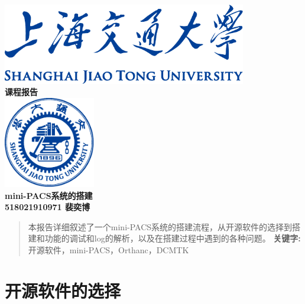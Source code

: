 \documentclass[UTF8]{ctexart}
\begin{document}

\begin{titlepage}
    \begin{center}
        \includegraphics[width=0.8\textwidth]{sjtu-name-blue.pdf}\\[1cm]
        \textsc{\Huge \bfseries 课程报告}\\[1.5cm]
        \includegraphics[width=0.3\textwidth]{sjtu-badge-blue.pdf}\\[0.5cm]

        \Huge \bfseries{mini-PACS系统的搭建}\\[1cm]
        \Large \bfseries{518021910971 裴奕博}
    \end{center}
\end{titlepage}
\tableofcontents
\newpage

\begin{abstract}
    本报告详细叙述了一个mini-PACS系统的搭建流程，从开源软件的选择到搭建和功能的调试和log的解析，以及在搭建过程中遇到的各种问题。
    \textbf{关键字:} 开源软件，mini-PACS，Orthanc，DCMTK
\end{abstract}
\section{开源软件的选择}
\end{document}
